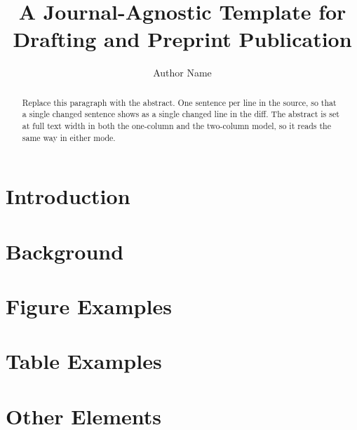 \documentclass[draft, twocolumn]{manuscript}
\title{A Journal-Agnostic Template for Drafting and Preprint Publication}
\author{Author Name}
\affiliation{Research Group, Institution,\\
Street Address, City POSTCODE, Country}
\begin{document}
\begin{abstract}
Replace this paragraph with the abstract.
One sentence per line in the source, so that a single changed sentence shows as a single changed line in the diff.
The abstract is set at full text width in both the one-column and the two-column model, so it reads the same way in either mode.
\end{abstract}

\maketitle

\section{Introduction}


\section{Background}


\section{Figure Examples}\label{sec:figures}


\section{Table Examples}\label{sec:tables}


\section{Other Elements}\label{sec:other}

\end{document}
